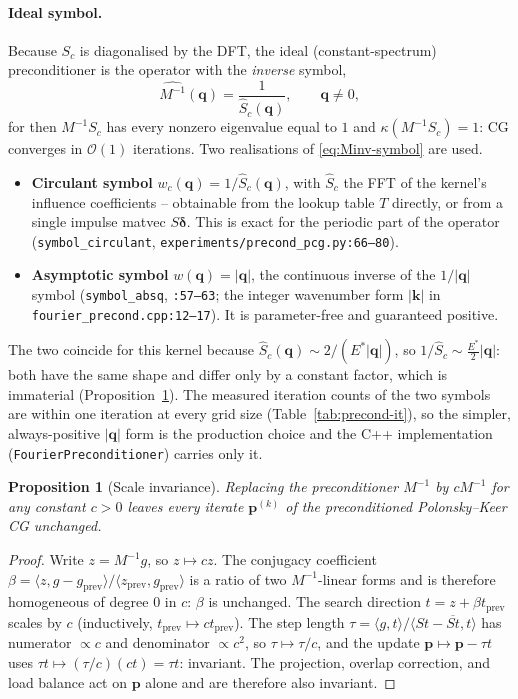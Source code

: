 \documentclass[11pt,a4paper]{article}
\newcommand{\Es}{E^{*}}
\newcommand{\Order}{\mathcal{O}}
\newcommand{\abs}[1]{\left\lvert #1 \right\rvert}
\newcommand{\pp}{\mathbf{p}}
\newcommand{\code}[1]{\texttt{#1}}
\newtheorem{proposition}{Proposition}
\theoremstyle{definition}
\theoremstyle{remark}
\begin{document}
\paragraph{Ideal symbol.}
Because $S_c$ is diagonalised by the DFT, the ideal (constant-spectrum)
preconditioner is the operator with the \emph{inverse} symbol,
\begin{equation}
  \widehat{M^{-1}}(\mathbf q) = \frac{1}{\widehat S_c(\mathbf q)},
  \qquad \mathbf q\ne 0,
  \label{eq:Minv-symbol}
\end{equation}
for then $M^{-1}S_c$ has every nonzero eigenvalue equal to $1$ and
$\kappa(M^{-1}S_c)=1$: CG converges in $\Order(1)$ iterations. Two realisations of
\eqref{eq:Minv-symbol} are used.
\begin{itemize}
\item \textbf{Circulant symbol} $w_c(\mathbf q)=1/\widehat S_c(\mathbf q)$, with
$\widehat S_c$ the FFT of the kernel's influence coefficients -- obtainable from
the lookup table $T$ directly, or from a single impulse matvec
$S\boldsymbol\delta$. This is exact for the periodic part of the operator
(\code{symbol\_circulant}, \code{experiments/precond\_pcg.py:66--80}).
\item \textbf{Asymptotic symbol} $w(\mathbf q)=\abs{\mathbf q}$, the continuous
inverse of the $1/\abs{\mathbf q}$ symbol (\code{symbol\_absq}, \code{:57--63};
the integer wavenumber form $\abs{\mathbf k}$ in
\code{fourier\_precond.cpp:12--17}). It is parameter-free and guaranteed
positive.
\end{itemize}
The two coincide for this kernel because $\widehat S_c(\mathbf q)\sim
2/(\Es\abs{\mathbf q})$, so $1/\widehat S_c\sim\tfrac{\Es}{2}\abs{\mathbf q}$:
both have the same shape and differ only by a constant factor, which is
immaterial (Proposition~\ref{prop:scale}). The measured iteration counts of the
two symbols are within one iteration at every grid size
(Table~\ref{tab:precond-it}), so the simpler, always-positive $\abs{\mathbf q}$
form is the production choice and the C++ implementation
(\code{FourierPreconditioner}) carries only it.

\begin{proposition}[Scale invariance]
\label{prop:scale}
Replacing the preconditioner $M^{-1}$ by $cM^{-1}$ for any constant $c>0$ leaves
every iterate $\pp^{(k)}$ of the preconditioned Polonsky--Keer CG unchanged.
\end{proposition}
\begin{proof}
Write $z=M^{-1}g$, so $z\mapsto cz$. The conjugacy coefficient
$\beta=\langle z,g-g_{\text{prev}}\rangle/\langle z_{\text{prev}},g_{\text{prev}}
\rangle$ is a ratio of two $M^{-1}$-linear forms and is therefore homogeneous of
degree $0$ in $c$: $\beta$ is unchanged. The search direction $t=z+\beta t_{\text{prev}}$
scales by $c$ (inductively, $t_{\text{prev}}\mapsto ct_{\text{prev}}$). The step
length $\tau=\langle g,t\rangle/\langle St-\overline{St},t\rangle$ has numerator
$\propto c$ and denominator $\propto c^2$, so $\tau\mapsto\tau/c$, and the update
$\pp\mapsto\pp-\tau t$ uses $\tau t\mapsto(\tau/c)(ct)=\tau t$: invariant. The
projection, overlap correction, and load balance act on $\pp$ alone and are
therefore also invariant.
\end{proof}
\end{document}
